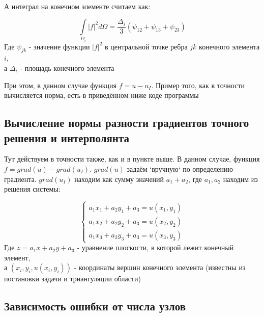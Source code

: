\documentclass[12pt]{article}
\begin{document}
А интеграл на конечном элементе считаем как:

$$
\int\limits_{\Omega_i}|f|^2d\Omega = \dfrac{\Delta_i}{3}(\psi_{12} + \psi_{13} + \psi_{23})
$$
Где $\psi_{jk}$ - значение функции $|f|^2$ в центральной точке ребра $jk$ конечного элемента $i$, \\
а $\Delta_i$ - площадь конечного элемента

При этом, в данном случае функция $f = u - u_I$. Пример того, как в точности вычисляется норма, есть в приведённом ниже коде программы

\subsection{Вычисление нормы разности градиентов точного решения и интерполянта}

Тут действуем в точности также, как и в пункте выше. В данном случае, функция $f = grad(u) - grad(u_I)$. $grad(u)$ задаём `вручную` по определению градиента. $grad(u_I)$ находим как сумму значений $a_1 + a_2$, где $a_1, a_2$ находим из решения системы:

\begin{equation}
 \begin{cases}
  a_1x_1 + a_2y_1 + a_3 = u(x_1, y_1) \\
  a_1x_2 + a_2y_2 + a_3 = u(x_2, y_2) \\
  a_1x_3 + a_2y_3 + a_3 = u(x_3, y_3)
 \end{cases}
 \nonumber
\end{equation}
Где $z = a_1x + a_2y + a_3$ - уравнение плоскости, в которой лежит конечный элемент, \\
а $(x_i, y_i, u(x_i, y_i))$ - координаты вершин конечного элемента (известны из постановки задачи и триангуляции области)

\subsection{Зависимость ошибки от числа узлов}

\begin{center}
\end{center} 
\end{document}
